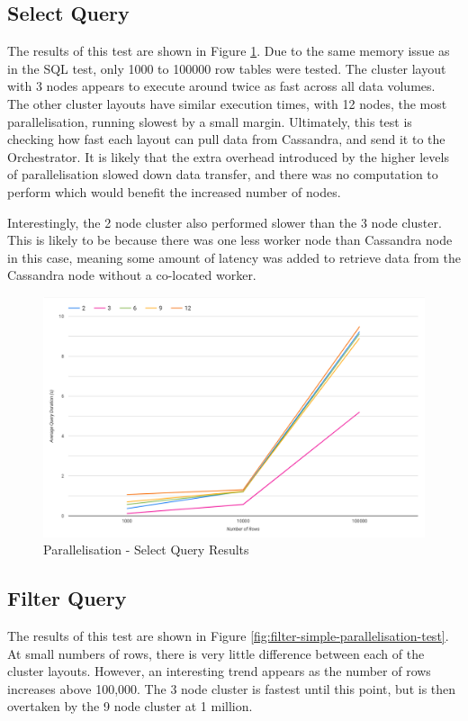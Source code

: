 \subsection{Select Query}
The results of this test are shown in Figure \ref{fig:select-simple-parallelisation-test}. Due to the same memory issue as in the SQL test, only 1000 to 100000 row tables were tested. The cluster layout with 3 nodes appears to execute around twice as fast across all data volumes. The other cluster layouts have similar execution times, with 12 nodes, the most parallelisation, running slowest by a small margin. Ultimately, this test is checking how fast each layout can pull data from Cassandra, and send it to the Orchestrator. It is likely that the extra overhead introduced by the higher levels of parallelisation slowed down data transfer, and there was no computation to perform which would benefit the increased number of nodes.

Interestingly, the 2 node cluster also performed slower than the 3 node cluster. This is likely to be because there was one less worker node than Cassandra node in this case, meaning some amount of latency was added to retrieve data from the Cassandra node without a co-located worker.

\begin{figure}[ht]
	\centering
	\includegraphics[width=0.8\linewidth]{chapters/diagrams/testing/select-simple-parallelisation-test}
	\caption{Parallelisation - Select Query Results}
	\label{fig:select-simple-parallelisation-test}
\end{figure}

\subsection{Filter Query}
The results of this test are shown in Figure \ref{fig:filter-simple-parallelisation-test}. At small numbers of rows, there is very little difference between each of the cluster layouts. However, an interesting trend appears as the number of rows increases above 100,000. The 3 node cluster is fastest until this point, but is then overtaken by the 9 node cluster at 1 million.

